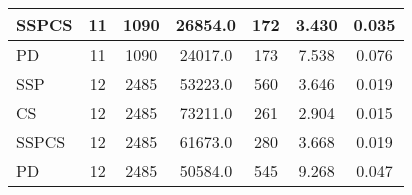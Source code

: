 \documentclass{article}
\begin{document}
\begin{table}[H]
{\begin{tabular}{|l|c|c|c|c|c|c|}
SSPCS              & 11             & 1090              & 26854.0                & 172            & 3.430                     & 0.035                                   \\ \hline
PD                 & 11             & 1090              & 24017.0                & 173            & 7.538                     & 0.076                                   \\ \hline
\hhline{|=======|}
SSP                & 12             & 2485              & 53223.0                & 560            & 3.646                     & 0.019                                   \\ \hline
CS                 & 12             & 2485              & 73211.0                & 261            & 2.904                     & 0.015                                   \\ \hline
SSPCS              & 12             & 2485              & 61673.0                & 280            & 3.668                     & 0.019                                   \\ \hline
PD                 & 12             & 2485              & 50584.0                & 545            & 9.268                     & 0.047                                   \\ \hline
\end{tabular}%
}
\label{tab:simulation2_set1_algorithm_metrics}
\end{table}

\begin{table}[H]
\centering
\caption{Simulation 2, Set 2: Graph Characteristics}
\label{tab:simulation2_set2_graph_characteristics}
\end{table}
\end{document}
